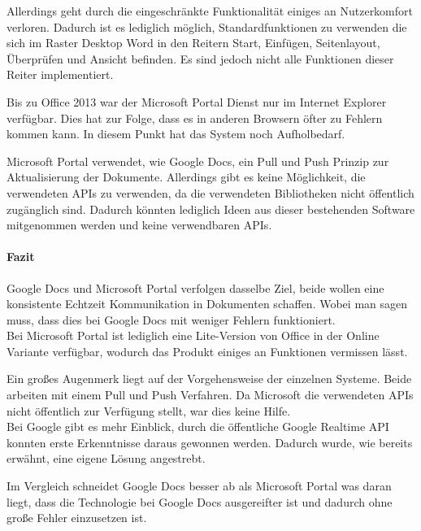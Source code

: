 Allerdings geht durch die eingeschränkte Funktionalität einiges an Nutzerkomfort verloren. Dadurch ist es lediglich möglich, Standardfunktionen zu verwenden die sich im Raster Desktop Word in den Reitern Start, Einfügen, Seitenlayout, Überprüfen und Ansicht befinden. Es sind jedoch nicht alle Funktionen dieser Reiter implementiert.

Bis zu Office 2013 war der Microsoft Portal Dienst nur im Internet Explorer verfügbar. Dies hat zur Folge, dass es in anderen Browsern öfter zu Fehlern kommen kann. In diesem Punkt hat das System noch Aufholbedarf.

Microsoft Portal verwendet, wie Google Docs, ein Pull und Push Prinzip zur Aktualisierung der Dokumente. Allerdings gibt es keine Möglichkeit, die verwendeten APIs zu verwenden, da die verwendeten Bibliotheken nicht öffentlich zugänglich sind. Dadurch könnten lediglich Ideen aus dieser bestehenden Software mitgenommen werden und keine verwendbaren APIs.

\paragraph{Fazit}
Google Docs und Microsoft Portal verfolgen dasselbe Ziel, beide wollen eine konsistente Echtzeit Kommunikation in Dokumenten schaffen. Wobei man sagen muss, dass dies bei Google Docs mit weniger Fehlern funktioniert.\\
Bei Microsoft Portal ist lediglich eine Lite-Version von Office in der Online Variante verfügbar, wodurch das Produkt einiges an Funktionen vermissen lässt.

Ein großes Augenmerk liegt auf der Vorgehensweise der einzelnen Systeme. Beide arbeiten mit einem Pull und Push Verfahren. Da Microsoft die verwendeten APIs nicht öffentlich zur Verfügung stellt, war dies keine Hilfe.\\
Bei Google gibt es mehr Einblick, durch die öffentliche Google Realtime API konnten erste Erkenntnisse daraus gewonnen werden. Dadurch wurde, wie bereits erwähnt, eine eigene Lösung angestrebt.

Im Vergleich schneidet Google Docs besser ab als Microsoft Portal was daran liegt, dass die Technologie bei Google Docs ausgereifter ist und dadurch ohne große Fehler einzusetzen ist.